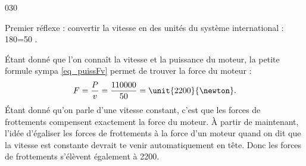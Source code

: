 

\begin{corrige}{030}

Premier réflexe : convertir la vitesse en des unités du système international : \unit{180}{\kilo\meter\per\hour}=\unit{50}{ \meter\per\second}.

Étant donné que l'on connaît la vitesse et la puissance du moteur, la \og petite formule sympa\fg{} \eqref{eq_puissFv} permet de trouver la force du moteur :
\[ 
  F=\frac{ P }{ v }=\frac{ 110000 }{ 50 }=\unit{2200}{\newton}.
\]
Étant donné qu'on parle d'une vitesse constant, c'est que les forces de frottements compensent exactement la force du moteur. À partir de maintenant, l'idée d'égaliser les forces de frottements à la force d'un moteur quand on dit que la vitesse est constante devrait te venir automatiquement en tête. Donc les forces de frottements s'élèvent également à \unit{2200}{\newton}.

\end{corrige}
